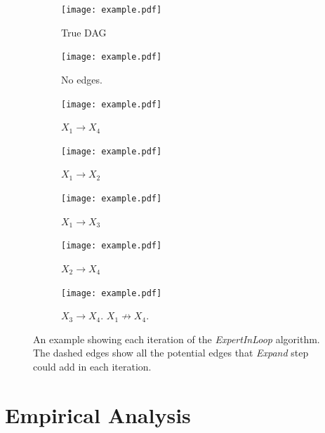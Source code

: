 \documentclass{uai2025} %
\begin{document}
\begin{figure}[t!]
	\begin{subfigure}{0.125 \textwidth}
		\centering
		\texttt{[image: example.pdf]}
		\caption{True DAG}
	\end{subfigure}%
	\begin{subfigure}{0.125 \textwidth}
		\centering
		\texttt{[image: example.pdf]}
		\caption{No edges.}
	\end{subfigure}%
	\begin{subfigure}{0.125 \textwidth}
		\centering
		\texttt{[image: example.pdf]}
		\caption{$ X_1 \rightarrow X_4 $}
	\end{subfigure}%
	\begin{subfigure}{0.125 \textwidth}
		\centering
		\texttt{[image: example.pdf]}
		\caption{$ X_1 \rightarrow X_2 $}
	\end{subfigure}
	\begin{subfigure}{0.125 \textwidth}
		\centering
		\texttt{[image: example.pdf]}
		\caption{$ X_1 \rightarrow X_3 $}
	\end{subfigure}%
	\begin{subfigure}{0.125 \textwidth}
		\centering
		\texttt{[image: example.pdf]}
		\caption{$ X_2 \rightarrow X_4 $}
	\end{subfigure}%
	\begin{subfigure}{0.250 \textwidth}
		\centering
		\texttt{[image: example.pdf]}
		\caption{$ X_3 \rightarrow X_4 $. $ X_1 \not \rightarrow X_4 $.}
	\end{subfigure}
	\caption{An example showing each iteration of the \emph{ExpertInLoop} algorithm. The dashed edges show all the potential edges that \emph{Expand} step could add in each iteration.}
\end{figure}




\section{Empirical Analysis}
\label{sec:empirical}
\end{document}
